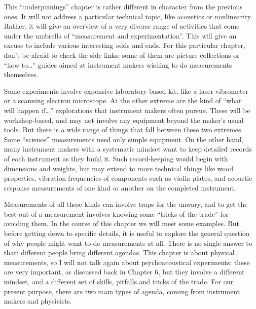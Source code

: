   This “underpinnings” chapter is rather different in character from the 
  previous ones. It will not address a particular technical topic, like 
  acoustics or nonlinearity. Rather, it will give an overview of a very diverse 
  range of activities that come under the umbrella of “measurement and 
  experimentation”. This will give an excuse to include various interesting 
  odds and ends. For this particular chapter, don’t be afraid to check the side 
  links: some of them are picture collections or “how to…” guides aimed at 
  instrument makers wishing to do measurements themselves. 

  Some experiments involve expensive laboratory-based kit, like a laser 
  vibrometer or a scanning electron microscope. At the other extreme are the 
  kind of “what will happen if…” explorations that instrument makers often 
  pursue. These will be workshop-based, and may not involve any equipment 
  beyond the maker’s usual tools. But there is a wide range of things that fall 
  between these two extremes. Some “science” measurements need only simple 
  equipment. On the other hand, many instrument makers with a systematic 
  mindset want to keep detailed records of each instrument as they build it. 
  Such record-keeping would begin with dimensions and weights, but may extend 
  to more technical things like wood properties, vibration frequencies of 
  components such as violin plates, and acoustic response measurements of one 
  kind or another on the completed instrument. 

  Measurements of all these kinds can involve traps for the unwary, and to get 
  the best out of a measurement involves knowing some “tricks of the trade” for 
  avoiding them. In the course of this chapter we will meet some examples. But 
  before getting down to specific details, it is useful to explore the general 
  question of why people might want to do measurements at all. There is no 
  single answer to that: different people bring different agendas. This chapter 
  is about physical measurements, so I will not talk again about 
  psychoacoustical experiments: these are very important, as discussed back in 
  Chapter 6, but they involve a different mindset, and a different set of 
  skills, pitfalls and tricks of the trade. For our present purpose, there are 
  two main types of agenda, coming from instrument makers and physicists. 


